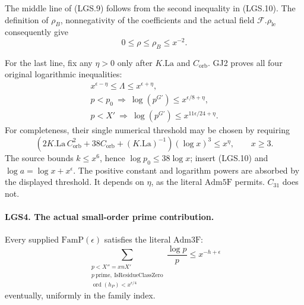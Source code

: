 The middle line of (LGS.9) follows from the second inequality
in (LGS.10).  The definition of \(\rho_B\), nonnegativity of
the coefficients and the actual field
\(\mathcal F.\rho_{\mathrm{le}}\) consequently give
\[
              0\le\rho\le\rho_B\le x^{-2}.             \tag{LGS.11}
\]

For the last line, fix any \(\eta>0\) only after
\(K.\mathrm{La}\) and \(C_{\mathrm{orb}}\).  GJ2 proves all
four original logarithmic inequalities:
\[
 \begin{gathered}
 x^{\epsilon-\eta}\le\Lambda\le x^{\epsilon+\eta},\\
 p<p_0\ \Longrightarrow\ \log(p^{G'})
                       \le x^{\epsilon/8+\eta},\\
 p<X'\ \Longrightarrow\ \log(p^{G'})
                       \le x^{11\epsilon/24+\eta}.
 \end{gathered}                                                   \tag{LGS.12}
\]
For completeness, their single numerical threshold may be
chosen by requiring
\[
 (2K.\mathrm{La}\,C_{\mathrm{orb}}^2
       +38C_{\mathrm{orb}}+(K.\mathrm{La})^{-1})
                  (\log x)^3\le x^\eta,\qquad x\ge3.
 \]
The source bounds \(k\le x^6\), hence
\(\log p_0\le38\log x\); insert (LGS.10) and
\(\log a=\log x+x^\epsilon\).
The positive constant and logarithm powers are absorbed by
the displayed threshold.  It depends on \(\eta\), as the
literal \(\mathrm{Adm5F}\) permits.  \(C_{31}\) does not.

\paragraph{LGS4. The actual small-order prime contribution.}
\label{claim:LGS4}
Every supplied \(\mathrm{FamP}(\epsilon)\) satisfies the
literal \(\mathrm{Adm3F}\):
\[
 \sum_{\substack{p<X''=xnX'\\p\ \mathrm{prime},\
                      \mathrm{IsResidueClassZero}\\
                 \operatorname{ord}(h_P)<x^{\epsilon/4}}}
                    \frac{\log p}{p}
              \le x^{-h+\epsilon}                      \tag{LGS.13}
\]
eventually, uniformly in the family index.

